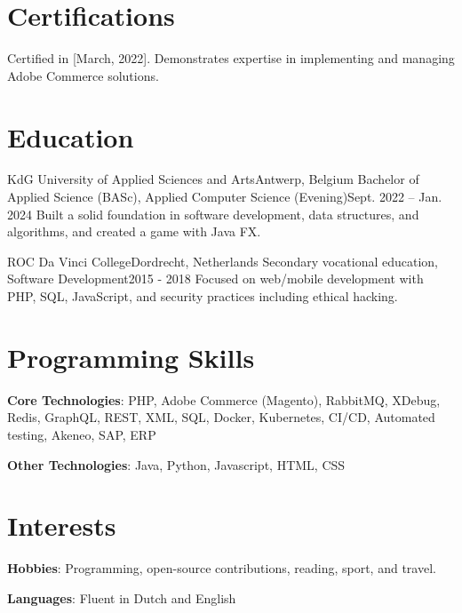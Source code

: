   \resumeSubHeadingListEnd

\section{Certifications}
  \resumeSubHeadingListStart
      {Certified in [March, 2022]. Demonstrates expertise in implementing and managing Adobe Commerce solutions.}
  \resumeSubHeadingListEnd

\section{Education}
  \resumeSubHeadingListStart
    \resumeSubheading
      {KdG University of Applied Sciences and Arts}{Antwerp, Belgium}
      {Bachelor of Applied Science (BASc), Applied Computer Science (Evening)}{Sept. 2022 -- Jan. 2024}
      \resumeItemListStart
          {Built a solid foundation in software development, data structures, and algorithms, and created a game with Java FX.}
      \resumeItemListEnd
      
    \resumeSubheading
      {ROC Da Vinci College}{Dordrecht, Netherlands}
      {Secondary vocational education, Software Development}{2015 - 2018}
      \resumeItemListStart
          {Focused on web/mobile development with PHP, SQL, JavaScript, and security practices including ethical hacking.}
      \resumeItemListEnd
  \resumeSubHeadingListEnd

\section{Programming Skills}
 \resumeSubHeadingListStart
   \item{
     \textbf{Core Technologies}{: PHP, Adobe Commerce (Magento), RabbitMQ, XDebug, Redis, GraphQL, REST, XML, SQL, Docker, Kubernetes, CI/CD, Automated testing, Akeneo, SAP, ERP}
   }
   \item{
     \textbf{Other Technologies}{: Java, Python, Javascript, HTML, CSS}
   }
 \resumeSubHeadingListEnd

\section{Interests}
 \resumeSubHeadingListStart
   \item{
     \textbf{Hobbies}{: Programming, open-source contributions, reading, sport, and travel.}
   }
   \item{
     \textbf{Languages}{: Fluent in Dutch and English}
   }
 \resumeSubHeadingListEnd